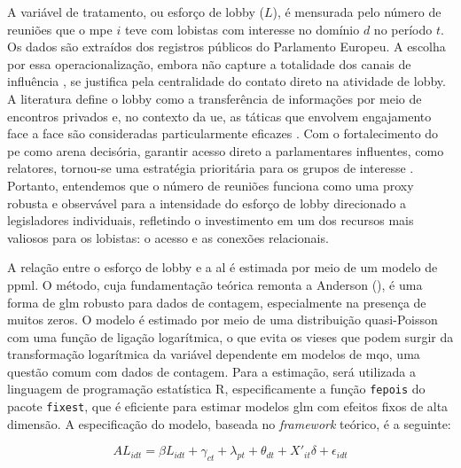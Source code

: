 A variável de tratamento, ou esforço de lobby ($L$), é mensurada pelo número de reuniões que o \acrshort{mpe} $i$ teve com lobistas com interesse no domínio $d$ no período $t$. Os dados são extraídos dos registros públicos do Parlamento Europeu. A escolha por essa operacionalização, embora não capture a totalidade dos canais de influência \cite{dur_measuring_2008}, se justifica pela centralidade do contato direto na atividade de lobby. A literatura define o lobby como a transferência de informações por meio de encontros privados \cite{de_figueiredo_advancing_2014} e, no contexto da \acrshort{ue}, as táticas que envolvem engajamento face a face são consideradas particularmente eficazes \cite{Huwyler2022}. Com o fortalecimento do \acrshort{pe} como arena decisória, garantir acesso direto a parlamentares influentes, como relatores, tornou-se uma estratégia prioritária para os grupos de interesse \cite{kluver2015legislative, marshall2010lobby}. Portanto, entendemos que o número de reuniões funciona como uma proxy robusta e observável para a intensidade do esforço de lobby direcionado a legisladores individuais, refletindo o investimento em um dos recursos mais valiosos para os lobistas: o acesso e as conexões relacionais.

A relação entre o esforço de lobby e a \acrshort{al} é estimada por meio de um modelo de \acrfull{ppml}. O método, cuja fundamentação teórica remonta a Anderson (\citeyear{anderson1979theoretical}), é uma forma de \acrfull{glm} robusto para dados de contagem, especialmente na presença de muitos zeros. O modelo é estimado por meio de uma distribuição quasi-Poisson com uma função de ligação logarítmica, o que evita os vieses que podem surgir da transformação logarítmica da variável dependente em modelos de \acrfull{mqo}, uma questão comum com dados de contagem. Para a estimação, será utilizada a linguagem de programação estatística R, especificamente a função \texttt{fepois} do pacote \texttt{fixest}, que é eficiente para estimar modelos \acrshort{glm} com efeitos fixos de alta dimensão. A especificação do modelo, baseada no \textit{framework} teórico, é a seguinte:

\begin{equation}
    \label{eq:modelo_final}
    AL_{idt} = \beta L_{idt} + \gamma_{ct} + \lambda_{pt} + \theta_{dt} + X'_{it}\delta + \epsilon_{idt}
\end{equation}

